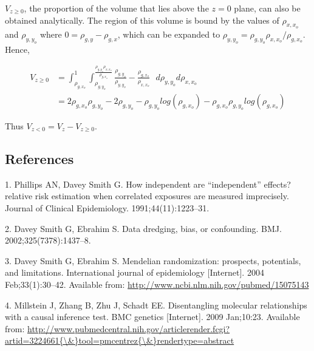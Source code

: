 \documentclass[]{article}
\begin{document}
\(V_{z \ge 0}\), the proportion of the volume that lies above the
\(z=0\) plane, can also be obtained analytically. The region of this
volume is bound by the values of \(\rho_{x,x_o}\) and \(\rho_{y,y_o}\)
where \(0 = \rho_{g,y} - \rho_{g,x}\), which can be expanded to
\(\rho_{y,y_o} = \rho_{g,y_o}\rho_{x,x_o} / \rho_{g,x_o}\). Hence,

\[
\begin{aligned}
V_{z \ge 0} & = \int^1_{\rho_{g,x_o}} \int^{\frac{\rho_{g,y_o}\rho_{x,x_o}}{\rho_{g,x_o}}}_{\rho_{g,y_o}} \frac{\rho_{g,y_o}}{\rho_{y,y_o}} - \frac{\rho_{g,x_o}}{\rho_{x,x_o}}\,\,\,\, d\rho_{y,y_o}d\rho_{x,x_o} \\
& = 2\rho_{g,x_o}\rho_{g,y_o} - 2\rho_{g,y_o} - \rho_{g,y_o}log(\rho_{g,x_o}) - \rho_{g,x_o}\rho_{g,y_o}log(\rho_{g,x_o})
\end{aligned}
\]

Thus \(V_{z < 0} = V_{z} - V_{z \geq 0}\).

\newpage

\subsection{References}\label{references}

\raggedright

\hypertarget{refs}{}
\hypertarget{ref-Phillips1991}{}
1. Phillips AN, Davey Smith G. How independent are ``independent''
effects? relative risk estimation when correlated exposures are measured
imprecisely. Journal of Clinical Epidemiology. 1991;44(11):1223--31.

\hypertarget{ref-DaveySmith2002}{}
2. Davey Smith G, Ebrahim S. Data dredging, bias, or confounding. BMJ.
2002;325(7378):1437--8.

\hypertarget{ref-DaveySmith2004}{}
3. Davey Smith G, Ebrahim S. Mendelian randomization: prospects,
potentials, and limitations. International journal of epidemiology
{[}Internet{]}. 2004 Feb;33(1):30--42. Available from:
\url{http://www.ncbi.nlm.nih.gov/pubmed/15075143}

\hypertarget{ref-Millstein2009}{}
4. Millstein J, Zhang B, Zhu J, Schadt EE. Disentangling molecular
relationships with a causal inference test. BMC genetics {[}Internet{]}.
2009 Jan;10:23. Available from:
\href{http://www.pubmedcentral.nih.gov/articlerender.fcgi?artid=3224661\%7B/\&\%7Dtool=pmcentrez\%7B/\&\%7Drendertype=abstract}{http://www.pubmedcentral.nih.gov/articlerender.fcgi?artid=3224661\{\textbackslash{}\&\}tool=pmcentrez\{\textbackslash{}\&\}rendertype=abstract}
\end{document}
